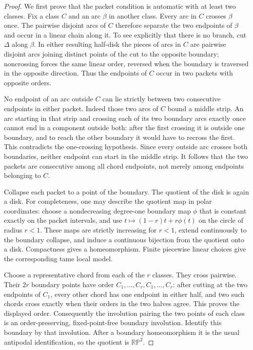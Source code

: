 \documentclass[11pt,a4paper]{article}
\begin{document}
\begin{proof}
We first prove that the packet condition is automatic with at least
two classes.  Fix a class $C$ and an arc $\beta$ in another class.
Every arc in $C$ crosses $\beta$ once.  The pairwise disjoint arcs of
$C$ therefore separate the two endpoints of $\beta$ and occur in a
linear chain along it.  To see explicitly that there is no branch,
cut $\Delta$ along $\beta$.  In either resulting half-disk the pieces
of arcs in $C$ are pairwise disjoint arcs joining distinct points of
the cut to the opposite boundary; noncrossing forces the same linear
order, reversed when the boundary is traversed in the opposite
direction.  Thus the endpoints of $C$ occur in two packets with
opposite orders.

No endpoint of an arc outside $C$ can lie strictly between two
consecutive endpoints in either packet.  Indeed those two arcs of
$C$ bound a middle strip.  An arc starting in that strip and crossing
each of its two boundary arcs exactly once cannot end in a component
outside both: after the first crossing it is outside one boundary,
and to reach the other boundary it would have to recross the first.
This contradicts the one-crossing hypothesis.  Since every outside
arc crosses both boundaries, neither endpoint can start in the
middle strip.  It follows that the two packets are consecutive among
all chord endpoints, not merely among endpoints belonging to $C$.

Collapse each packet to a point of the boundary.  The quotient of the
disk is again a disk.  For completeness, one may describe the quotient
map in polar coordinates: choose a nondecreasing degree-one boundary
map $\phi$ that is constant exactly on the packet intervals, and use
$t\mapsto (1-r)t+r\phi(t)$ on the circle of radius $r<1$.  These maps
are strictly increasing for $r<1$, extend continuously to the boundary
collapse, and induce a continuous bijection from the quotient onto a
disk.  Compactness gives a homeomorphism.  Finite piecewise linear
choices give the corresponding tame local model.

Choose a representative chord from each of the $r$ classes.  They
cross pairwise.  Their $2r$ boundary points have order
$C_1,\ldots,C_r,C_1,\ldots,C_r$: after cutting at the two endpoints
of $C_1$, every other chord has one endpoint in either half, and two
such chords cross exactly when their orders in the two halves agree.
This proves the displayed order.  Consequently the involution pairing
the two points of each class is an order-preserving, fixed-point-free
boundary involution.  Identify this boundary by that involution.
After a boundary homeomorphism it is the usual antipodal
identification, so the quotient is $\mathbb {RP}^2$.


\end{proof}
\end{document}
